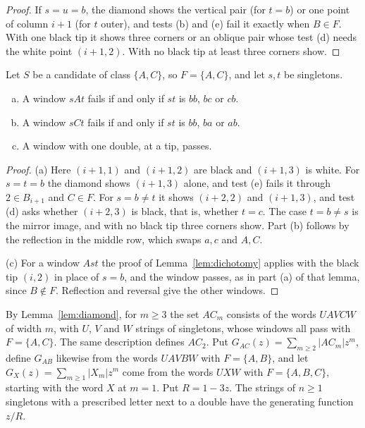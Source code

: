 \begin{proof}
If $s=u=b$, the diamond shows the vertical pair (for $t=b$) or one point of column $i+1$ (for
$t$ outer), and tests (b) and (e) fail it exactly when $B\in F$. With one black tip it shows
three corners or an oblique pair whose test (d) needs the white point $(i+1,2)$. With no
black tip at least three corners show.
\end{proof}

\begin{lemma}\label{lem:sixofnine}
Let $S$ be a candidate of class $\{A,C\}$, so $F=\{A,C\}$, and let $s,t$ be singletons.
\begin{enumerate}[(a)]
\item A window $sAt$ fails if and only if $st$ is $bb$, $bc$ or $cb$.
\item A window $sCt$ fails if and only if $st$ is $bb$, $ba$ or $ab$.
\item A window with one double, at a tip, passes.
\end{enumerate}
\end{lemma}

\begin{proof}
(a) Here $(i+1,1)$ and $(i+1,2)$ are black and $(i+1,3)$ is white. For $s=t=b$ the diamond shows
$(i+1,3)$ alone, and test (e) fails it through $2\in B_{i+1}$ and $C\in F$. For $s=b\ne t$ it
shows $(i+2,2)$ and $(i+1,3)$, and test (d) asks whether $(i+2,3)$ is black, that is, whether
$t=c$. The case $t=b\ne s$ is the mirror image, and with no black tip three corners show.
Part (b) follows by the reflection in the middle row, which swaps $a,c$ and $A,C$.

(c) For a window $Ast$ the proof of Lemma~\ref{lem:dichotomy} applies with the black tip $(i,2)$
in place of $s=b$, and the window passes, as in part (a) of that lemma, since $B\notin F$. Reflection and reversal give the
other windows.
\end{proof}

By Lemma~\ref{lem:diamond}, for $m\ge3$ the set $AC_m$ consists of the words $UAVCW$ of width
$m$, with $U$, $V$ and $W$ strings of singletons, whose windows all pass with $F=\{A,C\}$. The
same description defines $AC_2$. Put $G_{AC}(z)=\sum_{m\ge2}|AC_m|z^m$, define $G_{AB}$ likewise
from the words $UAVBW$ with $F=\{A,B\}$, and let $G_X(z)=\sum_{m\ge1}|X_m|z^m$ come from the
words $UXW$ with $F=\{A,B,C\}$, starting with the word $X$ at $m=1$. Put $R=1-3z$. The strings
of $n\ge1$ singletons with a prescribed letter next to a double have the generating function $z/R$.

